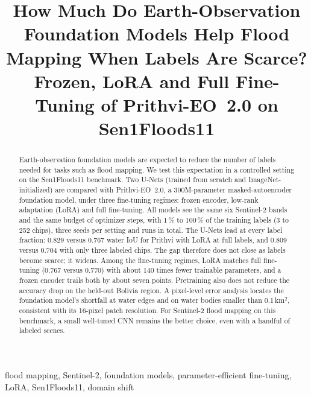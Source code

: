 \documentclass[conference]{IEEEtran}
\begin{document}
\title{How Much Do Earth-Observation Foundation Models Help Flood Mapping When Labels Are Scarce?\\
\large Frozen, LoRA and Full Fine-Tuning of Prithvi-EO~2.0 on Sen1Floods11}

\author{
}

\maketitle

\begin{abstract}
Earth-observation foundation models are expected to reduce the number of labels needed for tasks such as flood mapping. We test this expectation in a controlled setting on the Sen1Floods11 benchmark. Two U-Nets (trained from scratch and ImageNet-initialized) are compared with Prithvi-EO~2.0, a 300M-parameter masked-autoencoder foundation model, under three fine-tuning regimes: frozen encoder, low-rank adaptation (LoRA) and full fine-tuning. All models see the same six Sentinel-2 bands and the same budget of optimizer steps, with 1\,\% to 100\,\% of the training labels (3 to 252 chips), three seeds per setting and \nruns{} runs in total. The U-Nets lead at every label fraction: 0.829 versus 0.767 water IoU for Prithvi with LoRA at full labels, and 0.809 versus 0.704 with only three labeled chips. The gap therefore does not close as labels become scarce; it widens. Among the fine-tuning regimes, LoRA matches full fine-tuning (0.767 versus 0.770) with about 140 times fewer trainable parameters, and a frozen encoder trails both by about seven points. Pretraining also does not reduce the accuracy drop on the held-out Bolivia region. A pixel-level error analysis locates the foundation model's shortfall at water edges and on water bodies smaller than 0.1\,km$^2$, consistent with its 16-pixel patch resolution. For Sentinel-2 flood mapping on this benchmark, a small well-tuned CNN remains the better choice, even with a handful of labeled scenes.
\end{abstract}

\begin{IEEEkeywords}
flood mapping, Sentinel-2, foundation models, parameter-efficient fine-tuning, LoRA, Sen1Floods11, domain shift
\end{IEEEkeywords}
\end{document}
